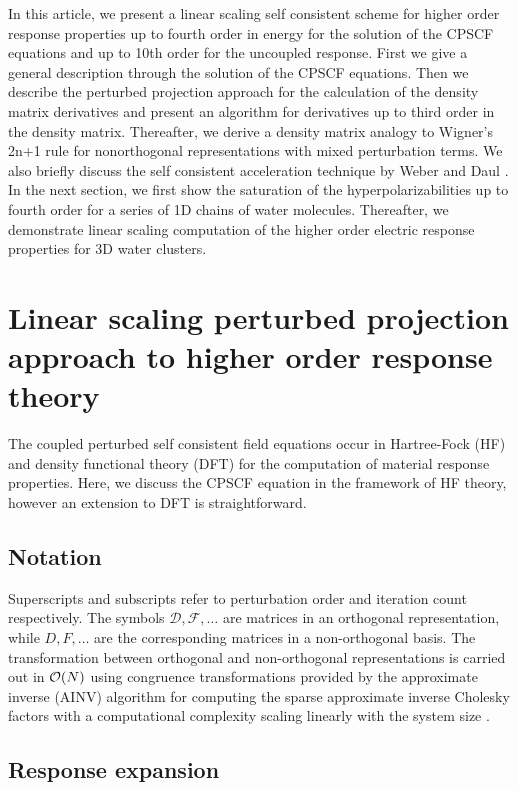 \documentclass[prl,aps,twocolumn,showpacs,twocolumngrid,superbib]{revtex4}
\begin{document}
 In this article, we present a linear scaling self consistent scheme
 for higher order response properties up to fourth order in energy for
 the solution of the CPSCF equations and up to 10th order for the uncoupled response.
 First we give a general description through the solution of the CPSCF equations.
 Then we describe the perturbed projection approach for the calculation
 of the density matrix derivatives and present
 an algorithm for derivatives up to third order in the density matrix.
 Thereafter, we derive a density matrix analogy to Wigner's 2n+1 rule 
 for nonorthogonal representations with mixed perturbation terms. We also briefly 
 discuss the self consistent acceleration technique by Weber and Daul \cite{Weber_2003}. 
 In the next section, we first show the saturation of the hyperpolarizabilities up to 
 fourth order for a series of 1D chains of water molecules. Thereafter, we demonstrate
 linear scaling computation of the higher order electric response properties
 for 3D water clusters.

\section{Linear scaling perturbed projection approach to higher order response theory}


The coupled perturbed self consistent field equations occur in Hartree-Fock (HF)
and density functional theory (DFT) for the computation of material response
properties. Here, we discuss the CPSCF equation in the framework of
HF theory, however an extension to DFT is straightforward.

\subsection{Notation}

Superscripts and subscripts refer to perturbation order and 
iteration count respectively. The symbols $\mathcal{D},\mathcal{F},\dots$
are matrices in an orthogonal representation, while
$D,F,\dots$ are the corresponding matrices in a non-orthogonal basis.
The transformation between orthogonal and non-orthogonal 
representations is carried out in ${\cal O}(N)$ using
congruence transformations \cite{JWilkinson65,GStewart73} provided 
by the approximate inverse (AINV) algorithm for computing the sparse 
approximate inverse Cholesky factors with a computational complexity
scaling linearly with the system size \cite{MBenzi95,MBenzi96,MBenzi01}.

\subsection{Response expansion}
\end{document}
